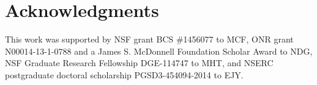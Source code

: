 \documentclass[10pt,letterpaper]{article}
\begin{document}
\section{Acknowledgments}

This work was supported by NSF grant BCS \#1456077 to MCF, ONR grant N00014-13-1-0788 and a James S. McDonnell Foundation Scholar Award to NDG, NSF Graduate Research Fellowship DGE-114747 to MHT, and NSERC postgraduate doctoral scholarship PGSD3-454094-2014 to EJY. 


\setlength{\bibleftmargin}{.125in}
\setlength{\bibindent}{-\bibleftmargin}


\end{document}
